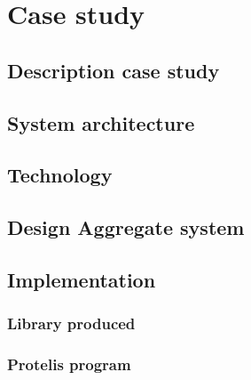 \chapter{Case study}
\label{chap:case-staudy}
\section{Description case study}
\section{System architecture}
\section{Technology}
\section{Design Aggregate system}
\section{Implementation}
\subsection{Library produced}
\subsection{Protelis program}